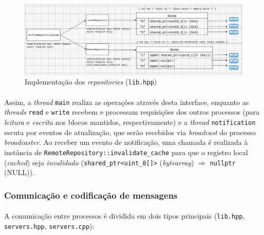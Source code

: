 \documentclass[12pt]{article}
\begin{document}
\begin{figure}[h!]
\centerline{\includegraphics[totalheight=6cm]{INE5645-slide-5.drawio.png}}
  \caption{Implementação dos \textit{repositories} (\texttt{lib.hpp})}
  \label{fig:repositories}
\end{figure}

\paragraph{}
Assim, a \textit{thread} \texttt{main} realiza as operações através desta interface, enquanto as \textit{threads}
\texttt{read} e \texttt{write} recebem e processam requisições dos outros processos (para \textit{leitura} e
\textit{escrita} nos blocos mantidos, respectivamente) e a \textit{thread} \texttt{notification} escuta por eventos de
atualização, que serão recebidos via \textit{broadcast} do processo \textit{broadcaster}. Ao receber um evento de
notificação, uma chamada é realizada à instância de \texttt{RemoteRepository::invalidate\_cache} para que o registro
local (\textit{cached}) seja \textit{invalidado} (\verb|shared_ptr<uint_8[]>| (\textit{bytearray}) \(\Rightarrow\) \texttt{nullptr}
(NULL)).

\subsubsection{Comunicação e codificação de mensagens}
\paragraph{}
A comunicação entre processos é dividida em dois tipos principais (\texttt{lib.hpp}, \texttt{servers.hpp}, \texttt{servers.cpp}):
\end{document}
